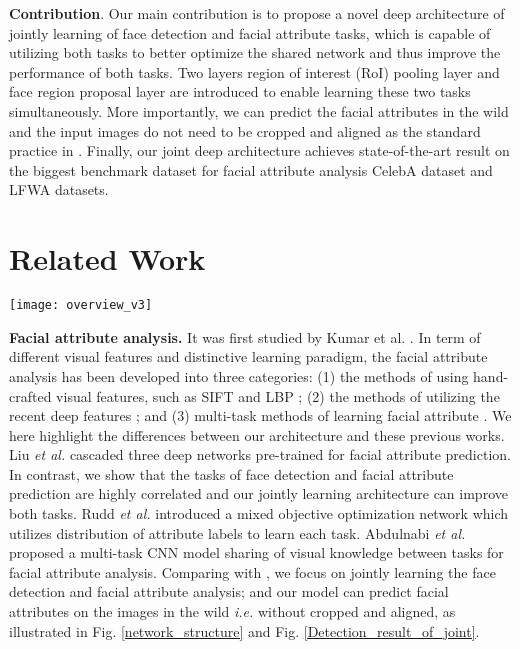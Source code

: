 \documentclass[10pt,twocolumn,letterpaper]{article}
\begin{document}
\vspace{0.05in}

\noindent \textbf{Contribution}. Our main contribution is to propose
a novel deep architecture of jointly learning of face detection
and facial attribute tasks, which is capable of utilizing both tasks
to better optimize the shared network and thus improve the performance
of both tasks. Two layers \textendash{} region of interest (RoI)
pooling layer and face region proposal layer are introduced to enable learning these two tasks simultaneously. More importantly, we
can predict the facial attributes in the wild and the input images
do not need to be cropped and aligned as the standard practice in \cite{rudd2016moon,wang2016walk}.
Finally, our joint deep architecture achieves state-of-the-art result
on the biggest benchmark dataset for facial attribute analysis\textendash{}
CelebA dataset \cite{liu2015deep} and LFWA \cite{liu2015deep,huang2007labeled}
datasets. 

\section{Related Work}

\begin{figure*}[t]
\begin{centering}
 \texttt{[image: overview\_v3]}
\par\end{centering}
\caption{Overview of the proposed architecture. }
\label{network_structure} 
\end{figure*}

\noindent \textbf{Facial attribute analysis. }It was first studied
by Kumar et al. \cite{kumar2009attribute}. In term of different visual
features and distinctive learning paradigm, the facial attribute analysis
has been developed into three categories: (1) the methods \cite{kumar2009attribute}
of using hand-crafted visual features, such as SIFT \cite{lowe2004distinctive}
and LBP \cite{lbp_tpami}; (2) the methods of utilizing the recent
deep features \cite{liu2015deep,off_shelf_face,wang2016walk}; and
(3) multi-task methods of learning facial attribute \cite{abdulnabi2015multi,rudd2016moon}.
We here highlight the differences between our architecture and these
previous works. Liu \emph{et al.} \cite{liu2015deep} cascaded three
deep networks pre-trained for facial attribute prediction. In contrast,
we show that the tasks of face detection and facial attribute prediction
are highly correlated and our jointly learning architecture can improve
both tasks. Rudd \emph{et al.} \cite{rudd2016moon} introduced a mixed
objective optimization network which utilizes distribution
of attribute labels to learn each task.
Abdulnabi \emph{et al.} \cite{abdulnabi2015multi} proposed a multi-task
CNN model sharing of visual knowledge between tasks for facial attribute
analysis. Comparing with \cite{rudd2016moon,abdulnabi2015multi},
we focus on jointly learning the face detection and facial attribute
analysis; and our model can predict facial attributes on the images
in the wild \cite{rudd2016moon,wang2016walk}\emph{ i.e.} without
cropped and aligned, as illustrated in Fig. \ref{network_structure}
and Fig. \ref{Detection_result_of_joint}. 
\end{document}
